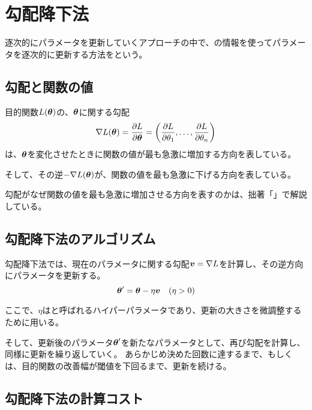 \documentclass[../../../topic_machine-learning]{subfiles}
\begin{document}
\sectionline
\section{勾配降下法}

逐次的にパラメータを更新していくアプローチの中で、の情報を使ってパラメータを逐次的に更新する方法をという。

\subsection{勾配と関数の値}

目的関数$L(\vb*{\theta})$の、$\vb*{\theta}$に関する勾配
\begin{equation*}
  \nabla L(\vb*{\theta}) = \frac{\partial L}{\partial \vb*{\theta}} = \left( \frac{\partial L}{\partial \theta_1}, \ldots, \frac{\partial L}{\partial \theta_n} \right)
\end{equation*}
は、$\vb*{\theta}$を変化させたときに関数の値が最も急激に増加する方向を表している。

そして、その逆$-\nabla L(\vb*{\theta})$が、関数の値を最も急激に下げる方向を表している。

\begin{supplnote}
  勾配がなぜ関数の値を最も急激に増加させる方向を表すのかは、拙著「\webbookA」で解説している。
\end{supplnote}

\subsection{勾配降下法のアルゴリズム}

勾配降下法では、現在のパラメータに関する勾配$\vb*{v} = \nabla L$を計算し、その逆方向にパラメータを更新する。
\begin{equation*}
  \vb*{\theta}' = \vb*{\theta} - \eta \vb*{v} \quad (\eta > 0)
\end{equation*}

ここで、$\eta$はと呼ばれるハイパーパラメータであり、更新の大きさを微調整するために用いる。

\br

そして、更新後のパラメータ$\vb*{\theta}'$を新たなパラメータとして、再び勾配を計算し、同様に更新を繰り返していく。
あらかじめ決めた回数に達するまで、もしくは、目的関数の改善幅が閾値を下回るまで、更新を続ける。

\subsection{勾配降下法の計算コスト}
\end{document}

